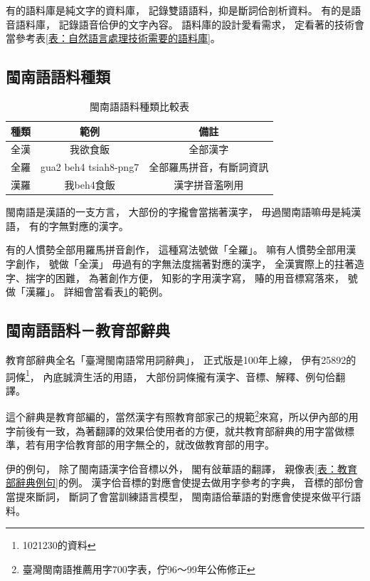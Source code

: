 有的語料庫是純文字的資料庫，
記錄雙語語料，抑是斷詞佮剖析資料。
有的是語音語料庫，
記錄語音佮伊的文字內容。
語料庫的設計愛看需求，
定看著的技術會當參考表\ref{表：自然語言處理技術需要的語料庫}。

\subsection{閩南語語料種類}
\label{節：閩南語語料種類}

\begin{table}
\caption{閩南語語料種類比較表}
\label{表：閩南語語料種類比較表}
\centering
\begin{tabular}{l|c|c}
種類 & 範例 & 備註\\
\hline
全漢 & 我欲食飯 & 全部漢字\\
全羅 & gua2 beh4 tsiah8-png7 & 全部羅馬拼音，有斷詞資訊\\
漢羅 &我beh4食飯 & 漢字拼音濫咧用\\
\end{tabular}
\end{table}

閩南語是漢語的一支方言，
大部份的字攏會當揣著漢字，
毋過閩南語嘛毋是純漢語，
有的字無對應的漢字。

有的人慣勢全部用羅馬拼音創作，
這種寫法號做「全羅」。
嘛有人慣勢全部用漢字創作，
號做「全漢」
毋過有的字無法度揣著對應的漢字，
全漢實際上的拄著造字、揣字的困難，
為著創作方便，
知影的字用漢字寫，
賰的用音標寫落來，
號做「漢羅」。
詳細會當看表\ref{表：閩南語語料種類比較表}的範例。

\subsection{閩南語語料－教育部辭典}
\label{節：教育部辭典}
教育部辭典全名「臺灣閩南語常用詞辭典」\cite{教育部臺灣閩南語常用詞辭典}，
正式版是100年上線，
伊有25892的詞條\footnote{1021230的資料}，
內底誠濟生活的用語，
大部份詞條攏有漢字、音標、解釋、例句佮翻譯。

這个辭典是教育部編的，當然漢字有照教育部家己的規範\footnote{臺灣閩南語推薦用字700字表，佇96～99年公佈修正}來寫，所以伊內部的用字前後有一致，為著翻譯的效果佮使用者的方便，就共教育部辭典的用字當做標準，若有用字佮教育部的用字無仝的，就改做教育部的用字。%

伊的例句，
除了閩南語漢字佮音標以外，
閣有敆華語的翻譯，
親像表\ref{表：教育部辭典例句}的例。
漢字佮音標的對應會使提去做用字參考的字典，
音標的部份會當提來斷詞，
斷詞了會當訓練語言模型，
閩南語佮華語的對應會使提來做平行語料。

